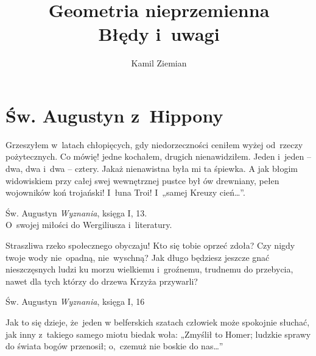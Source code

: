 \documentclass[a4paper,11pt]{article}
\title{Geometria nieprzemienna \\
  Błędy i~uwagi}
\author{Kamil Ziemian}
\newcommand{\attribA}[1]{#1}
\begin{document}





\maketitle %





\section{Św. Augustyn z~Hippony}



\noindent
Grzeszyłem w~latach chłopięcych, gdy niedorzeczności ceniłem
wyżej od~rzeczy pożytecznych. Co mówię! jedne kochałem, drugich
nienawidziłem. Jeden i~jeden -- dwa, dwa i~dwa -- cztery. Jakaż
nienawistna była mi ta śpiewka. A jak błogim widowiskiem przy całej
swej wewnętrznej pustce był ów drewniany, pełen wojowników koń
trojański! I~łuna Troi! I~„samej Kreuzy cień\ldots”.


\attribA{Św. Augustyn \textit{Wyznania}, księga I, 13. \\
  O~swojej miłości do Wergiliusza i~literatury.}

\vspace{\spaceThree}



\noindent
Straszliwa rzeko społecznego obyczaju! Kto się tobie oprzeć
zdoła? Czy nigdy twoje wody nie~opadną, nie~wyschną? Jak długo
będziesz jeszcze gnać nieszczęsnych ludzi ku morzu wielkiemu
i~groźnemu, trudnemu do przebycia, nawet dla tych którzy do drzewa
Krzyża przywarli?


\attribA{Św. Augustyn \textit{Wyznania}, księga I, 16}

\vspace{\spaceThree}




\noindent
Jak to się dzieje, że~jeden w belferskich szatach człowiek może
spokojnie słuchać, jak inny z~takiego samego miotu biedak woła:
„Zmyślił to Homer; ludzkie sprawy do świata bogów przenosił;
o,~czemuż nie boskie do nas\ldots”
\end{document}
